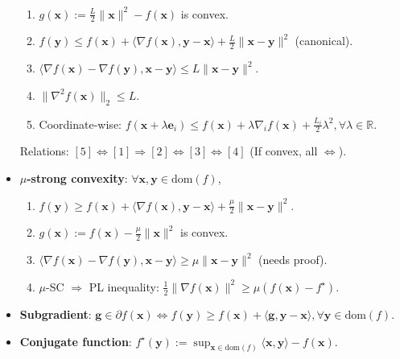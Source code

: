 \documentclass[a4paper]{article}
\newcommand{\R}{\mathbb{R}}
\renewcommand{\vec}[1]{\mathbf{#1}}
\newcommand{\dom}[1]{\mathrm{dom}(#1)}
\newenvironment{topic}[1]
{\textbf{\sffamily \colorbox{black}{\rlap{\textbf{\textcolor{white}{#1}}}\hspace{\linewidth}\hspace{-2\fboxsep}}} \\ \vspace{0.2cm}}
{}
\begin{document}
\begin{multicols*}{2}
\begin{topic}{Definitions}
\begin{itemize}
\begin{enumerate}
                      \item $g(\vec{x}) := \frac{L}{2} \| \vec{x} \|^2 - f(\vec{x})$ is convex.
                      \item $f(\vec{y}) \leq f(\vec{x}) + \langle \nabla f(\vec{x}), \vec{y} - \vec{x} \rangle + \frac{L}{2} \| \vec{x} - \vec{y} \|^2$ (canonical).
                      \item $\langle \nabla f(\vec{x}) - \nabla f(\vec{y}), \vec{x} - \vec{y} \rangle \leq L \| \vec{x} - \vec{y} \|^2$.
                      \item $\| \nabla^2 f(\vec{x}) \|_2 \leq L$.
                      \item Coordinate-wise: $f(\vec{x} + \lambda \vec{e}_i) \leq f(\vec{x}) + \lambda \nabla_i f(\vec{x}) +
                                \frac{L_i}{2} \lambda^2, \forall \lambda \in \R$.
                  \end{enumerate}
                  Relations: $[5] \Leftrightarrow [1] \Rightarrow [2] \Leftrightarrow [3] \Leftrightarrow [4]$ (If convex, all $\Leftrightarrow$).
            \item \textbf{$\mu$-strong convexity}: $\forall \vec{x}, \vec{y} \in \dom{f}$,
                  \begin{enumerate}
                      \item $f(\vec{y}) \geq f(\vec{x}) + \langle \nabla f(\vec{x}), \vec{y} - \vec{x} \rangle + \frac{\mu}{2} \| \vec{x} - \vec{y} \|^2$.
                      \item $g(\vec{x}) := f(\vec{x}) - \frac{\mu}{2} \| \vec{x} \|^2$ is convex.
                      \item $\langle \nabla f(\vec{x}) - \nabla f(\vec{y}), \vec{x} - \vec{y} \rangle \geq \mu \| \vec{x} - \vec{y} \|^2$ (needs proof).
                      \item $\mu$-SC $\Rightarrow$ PL inequality: $\frac{1}{2} \| \nabla f(\vec{x}) \|^2 \geq \mu (f(\vec{x}) - f^\star)$.
                  \end{enumerate}
            \item \textbf{Subgradient}: $\vec{g} \in \partial f(\vec{x}) \Leftrightarrow f(\vec{y}) \geq f(\vec{x}) + \langle \vec{g}, \vec{y} - \vec{x} \rangle, \forall \vec{y} \in \dom{f}$.
            \item \textbf{Conjugate function}: $f^\star(\vec{y}) := \sup_{\vec{x} \in \dom{f}} \langle \vec{x}, \vec{y} \rangle - f(\vec{x})$.
        \end{itemize}
    \end{topic}


\end{multicols*}
\end{document}
